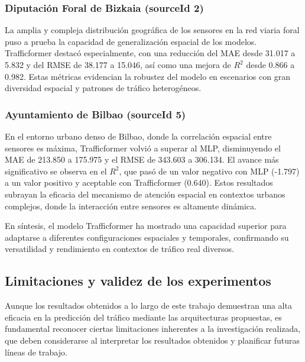 \subsubsection*{Diputación Foral de Bizkaia (sourceId 2)}  
La amplia y compleja distribución geográfica de los sensores en la red viaria foral puso a prueba la capacidad de generalización espacial de los modelos. Trafficformer destacó especialmente, con una reducción del MAE desde 31.017 a 5.832 y del RMSE de 38.177 a 15.046, así como una mejora de $R^2$ desde 0.866 a 0.982. Estas métricas evidencian la robustez del modelo en escenarios con gran diversidad espacial y patrones de tráfico heterogéneos.

\subsubsection*{Ayuntamiento de Bilbao (sourceId 5)}  
En el entorno urbano denso de Bilbao, donde la correlación espacial entre sensores es máxima, Trafficformer volvió a superar al MLP, disminuyendo el MAE de 213.850 a 175.975 y el RMSE de 343.603 a 306.134. El avance más significativo se observa en el $R^2$, que pasó de un valor negativo con MLP (-1.797) a un valor positivo y aceptable con Trafficformer (0.640). Estos resultados subrayan la eficacia del mecanismo de atención espacial en contextos urbanos complejos, donde la interacción entre sensores es altamente dinámica.

En síntesis, el modelo Trafficformer ha mostrado una capacidad superior para adaptarse a diferentes configuraciones espaciales y temporales, confirmando su versatilidad y rendimiento en contextos de tráfico real diversos.

\subsection{Limitaciones y validez de los experimentos}
\label{sec:limitaciones_validez}

\begin{comment}
	- Discusión sobre limitaciones técnicas, posibles sesgos, restricciones de hardware, tamaño de muestra, etc.
\end{comment}

Aunque los resultados obtenidos a lo largo de este trabajo demuestran una alta eficacia en la predicción del tráfico mediante las arquitecturas propuestas, es fundamental reconocer ciertas limitaciones inherentes a la investigación realizada, que deben considerarse al interpretar los resultados obtenidos y planificar futuras líneas de trabajo.

